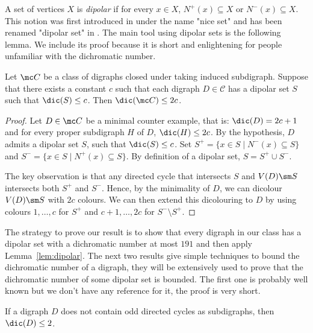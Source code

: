 

A set of vertices $X$ is \emph{dipolar} if for every $x \in X$, $N^+(x) \subseteq X$ or $N^-(x) \subseteq X$. 
This notion was first introduced in \cite{ACN21} under the name "nice set" and has been renamed "dipolar set" in \cite{CMPRS22}. 
The main tool using dipolar sets is the following lemma. We include its proof because it is short and enlightening for people unfamiliar with the dichromatic number. 

\begin{lemma}\label{lem:dipolar}
Let $\mc C$ be a class of digraphs closed under taking induced subdigraph. Suppose that there exists a constant $c$ such that each digraph $D \in \mathcal C$ has a dipolar set $S$ such that $\dic(S) \leq c$. Then $\dic(\mc C) \leq 2c$. 
\end{lemma}

\begin{proof}
Let $D \in \mc C$ be a minimal counter example, that is: $\dic(D)=2c+1$ and for every proper  subdigraph $H$ of $D$, $\dic(H)\le 2c$. 
By the hypothesis, $D$ admits a dipolar set $S$,  such that $\dic(S) \leq c$. 
Set $S^+ = \{x \in S \mid N^-(x) \subseteq S\}$ and $S^- = \{x \in S \mid N^+(x) \subseteq S\}$. By definition of a dipolar set, $S= S^+ \cup S^-$. 

The key observation is that any directed cycle that intersects $S$ and $V(D) \sm S$  intersects  both $S^+$ and $S^-$. 
Hence, by the minimality of $D$, we can dicolour  $V(D) \sm S$ with $2c$ colours. We can then extend this dicolouring to $D$ by using colours $1, \dots, c$ for $S^+$ and $c+1, \dots, 2c$ for $S^- \setminus S^+$. 
\end{proof}

The strategy to prove our result is to show that every digraph in our class has a dipolar set with a dichromatic number at most $191$ and then apply Lemma~\ref{lem:dipolar}. 
The next two results give simple techniques to bound the dichromatic number of a digraph, they  will  be extensively used to prove that the dichromatic number of some dipolar set is bounded. The first one is probably well known but we don't have any reference for it, the proof is very short.

\begin{lemma}\label{lem:odd_cycle}
If a digraph $D$ does not contain odd directed cycles as subdigraphs, then $\dic(D) \leq 2$. 
\end{lemma}

